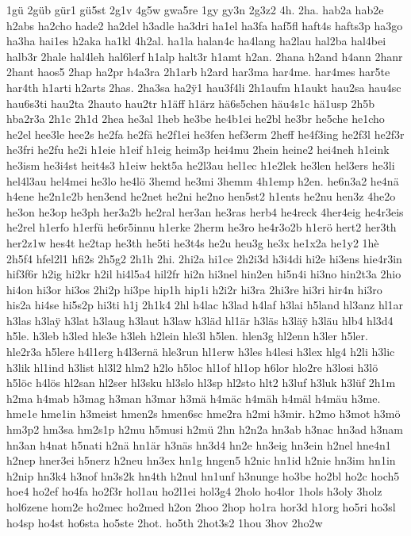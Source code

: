 {1gü
2güb
gür1
gü5st
2g1v
4g5w
gwa5re
1gy
gy3n
2g3z2
4h.
2ha.
hab2a
hab2e
h2abs
ha2cho
hade2
ha2del
h3adle
ha3dri
ha1el
ha3fa
haf5fl
haft4s
hafts3p
ha3go
ha3ha
hai1es
h2aka
ha1kl
4h2al.
ha1la
halan4c
ha4lang
ha2lau
hal2ba
hal4bei
halb3r
2hale
hal4leh
hal6lerf
h1alp
halt3r
h1amt
h2an.
2hana
h2and
h4ann
2hanr
2hant
haos5
2hap
ha2pr
h4a3ra
2h1arb
h2ard
har3ma
har4me.
har4mes
har5te
har4th
h1arti
h2arts
2has.
2ha3sa
ha2^^ff1
hau3f4li
2h1aufm
h1aukt
hau2sa
hau4sc
hau6s3ti
hau2ta
2hauto
hau2tr
h1äff
h1ärz
hä6s5chen
häu4s1c
hä1usp
2h5b
hba2r3a
2h1c
2h1d
2hea
he3al
1heb
he3be
he4b1ei
he2bl
he3br
he5che
he1cho
he2el
hee3le
hee2s
he2fa
he2fä
he2f1ei
he3fen
hef3erm
2heff
he4f3ing
he2f3l
he2f3r
he3fri
he2fu
he2i
h1eie
h1eif
h1eig
heim3p
hei4mu
2hein
heine2
hei4neh
h1eink
he3ism
he3i4st
heit4s3
h1eiw
hekt5a
he2l3au
hel1ec
h1e2lek
he3len
hel3ers
he3li
hel4l3au
hel4mei
he3lo
he4lö
3hemd
he3mi
3hemm
4h1emp
h2en.
he6n3a2
he4nä
h4ene
he2n1e2b
hen3end
he2net
he2ni
he2no
hen5st2
h1ents
he2nu
hen3z
4he2o
he3on
he3op
he3ph
her3a2b
he2ral
her3an
he3ras
herb4
he4reck
4her4eig
he4r3eis
he2rel
h1erfo
h1erfü
he6r5innu
h1erke
2herm
he3ro
he4r3o2b
h1erö
hert2
her3th
her2z1w
hes4t
he2tap
he3th
he5ti
he3t4s
he2u
heu3g
he3x
he1x2a
he1y2
1hè
2h5f4
hfel2l1
hfi2s
2h5g2
2h1h
2hi.
2hi2a
hi1ce
2h2i3d
h3i4di
hi2e
hi3ens
hie4r3in
hif3f6r
h2ig
hi2kr
h2il
hi4l5a4
hil2fr
hi2n
hi3nel
hin2en
hi5n4i
hi3no
hin2t3a
2hio
hi4on
hi3or
hi3os
2hi2p
hi3pe
hip1h
hip1i
h2i2r
hi3ra
2hi3re
hi3ri
hir4n
hi3ro
his2a
hi4se
hi5s2p
hi3ti
h1j
2h1k4
2hl
h4lac
h3lad
h4laf
h3lai
h5land
hl3anz
hl1ar
h3las
h3la^^ff
h3lat
h3laug
h3laut
h3law
h3läd
hl1är
h3läs
h3lä^^ff
h3läu
hlb4
hl3d4
h5le.
h3leb
h3led
hle3e
h3leh
h2lein
hle3l
h5len.
hlen3g
hl2enn
h3ler
h5ler.
hle2r3a
h5lere
h4l1erg
h4l3ernä
hle3run
hl1erw
h3les
h4lesi
h3lex
hlg4
h2li
h3lic
h3lik
hl1ind
h3list
hl3l2
hlm2
h2lo
h5loc
hl1of
hl1op
h6lor
hlo2re
h3losi
h3lö
h5löc
h4lös
hl2san
hl2ser
hl3sku
hl3slo
hl3sp
hl2sto
hlt2
h3luf
h3luk
h3lüf
2h1m
h2ma
h4mab
h3mag
h3man
h3mar
h3mä
h4mäc
h4mäh
h4mäl
h4mäu
h3me.
hme1e
hme1in
h3meist
hmen2s
hmen6sc
hme2ra
h2mi
h3mir.
h2mo
h3mot
h3mö
hm3p2
hm3sa
hm2s1p
h2mu
h5musi
h2mü
2hn
h2n2a
hn3ab
h3nac
hn3ad
h3nam
hn3an
h4nat
h5nati
h2nä
hn1är
h3näs
hn3d4
hn2e
hn3eig
hn3ein
h2nel
hne4n1
h2nep
hner3ei
h5nerz
h2neu
hn3ex
hn1g
hngen5
h2nic
hn1id
h2nie
hn3im
hn1in
h2nip
hn3k4
h3nof
hn3s2k
hn4th
h2nul
hn1unf
h3nunge
ho3be
ho2bl
ho2c
hoch5
hoe4
ho2ef
ho4fa
ho2f3r
hol1au
ho2l1ei
hol3g4
2holo
ho4lor
1hols
h3oly
3holz
hol6zene
hom2e
ho2mec
ho2med
h2on
2hoo
2hop
ho1ra
hor3d
h1org
ho5ri
ho3sl
ho4sp
ho4st
ho6sta
ho5ste
2hot.
ho5th
2hot3s2
1hou
3hov
2ho2w
}
